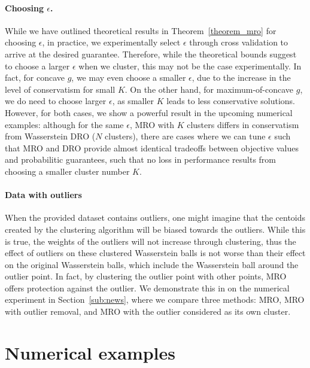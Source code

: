 \documentclass[12pt]{article}
\theoremstyle{thmstyleone}%
\theoremstyle{thmstyletwo}%
\theoremstyle{thmstylethree}%
\newcommand{\reviewChanges}{}
\begin{document}
\paragraph{Choosing $\epsilon$.}
While we have outlined theoretical results in Theorem~\ref{theorem_mro} for choosing $\epsilon$, in practice, we experimentally select $\epsilon$ through cross validation to arrive at the desired guarantee.
Therefore, while the theoretical bounds suggest to choose a larger $\epsilon$ when we cluster, this may not be the case experimentally.
\reviewChanges{In fact, for concave $g$, we may even choose a smaller $\epsilon$, due to the increase in the level of conservatism for small $K$. 
On the other hand, for maximum-of-concave $g$, we do need to choose larger $\epsilon$, as smaller $K$ leads to less conservative solutions. 
However, for both cases, we show a powerful result in the upcoming numerical examples: although for the same $\epsilon$, \gls{MRO} with $K$ clusters differs in conservatism from Wasserstein \gls{DRO} ($N$ clusters), there are cases where we can tune $\epsilon$ such that \gls{MRO} and \gls{DRO} provide almost identical tradeoffs between objective values and probabilitic guarantees, such that no loss in performance results from choosing a smaller cluster number $K$.}
\reviewChanges{
\paragraph{Data with outliers}
When the provided dataset contains outliers, one might imagine that the centoids created by the clustering algorithm will be biased towards the outliers. While this is true, the weights of the outliers will not increase through clustering, thus the effect of outliers on these clustered Wasserstein balls is not worse than their effect on the original Wasserstein balls, which include the Wasserstein ball around the outlier point. In fact, by clustering the outlier point with other points, \gls{MRO} offers protection against the outlier. We demonstrate this in on the numerical experiment in Section~\ref{sub:news}, where we compare three methods: \gls{MRO}, \gls{MRO} with outlier removal, and \gls{MRO} with the outlier considered as its own cluster.
}

\section{Numerical examples}
\label{sec:examples}
\end{document}
